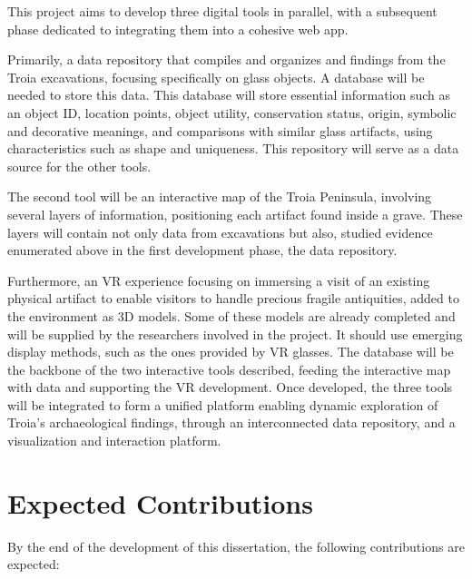 This project aims to develop three digital tools in parallel, with a subsequent phase dedicated to 
integrating them into a cohesive web app.


Primarily, a data repository that compiles and organizes and findings from 
the Troia excavations, focusing specifically on glass objects. A database will be needed to store this data. 
This database will store essential information such as an object ID, location points, object utility,
conservation status, origin, symbolic and decorative meanings, and comparisons with similar glass artifacts, using characteristics such as shape and uniqueness. 
This repository will serve as a data source for the other tools.


The second tool will be an interactive map of the Troia Peninsula, involving several layers of information, positioning each 
artifact found inside a grave. These layers will contain not only data from excavations but also, 
studied evidence enumerated above in the first development phase, the data repository.
 
Furthermore, an \gls{VR} experience focusing on immersing a visit of an existing physical 
artifact to enable visitors to handle precious fragile antiquities, added to the environment as \gls{3D} models. Some of these models are already completed and will be supplied by the researchers involved in the project.
It should use emerging display methods, such as the ones provided by \gls{VR} glasses.
The database will be the backbone of the two interactive tools described, feeding the interactive map with data and supporting the \gls{VR} development.
Once developed, the three tools will be integrated to form a unified platform enabling dynamic exploration of Troia's archaeological findings,
through an interconnected data repository, and a visualization and interaction platform.




\section{Expected Contributions}
\label{sec:expected_contributions}


By the end of the development of this dissertation, the following contributions are expected:


